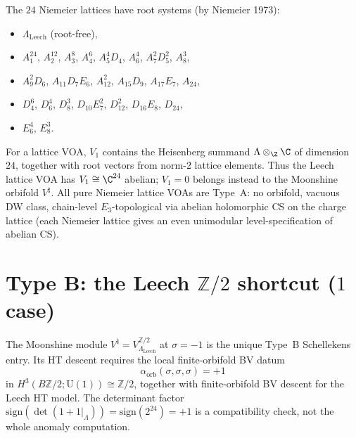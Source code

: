 \begin{remark}
\label{rem:schellekens-24-niemeier-enumeration}
The $24$ Niemeier lattices have root systems (by Niemeier 1973):
\begin{itemize}
\item $\Lambda_{\mathrm{Leech}}$ (root-free),
\item $A_1^{24}$, $A_2^{12}$, $A_3^8$, $A_4^6$,
$A_5^4D_4$, $A_6^4$, $A_7^2D_5^2$, $A_8^3$,
\item $A_9^2D_6$, $A_{11}D_7E_6$, $A_{12}^2$,
$A_{15}D_9$, $A_{17}E_7$, $A_{24}$,
\item $D_4^6$, $D_6^4$, $D_8^3$, $D_{10}E_7^2$,
$D_{12}^2$, $D_{16}E_8$, $D_{24}$,
\item $E_6^4$, $E_8^3$.
\end{itemize}
For a lattice VOA, $V_1$ contains the Heisenberg summand
$\Lambda \otimes_\Z \C$ of dimension~$24$, together with root vectors
from norm-$2$ lattice elements. Thus the Leech lattice VOA has
$V_1 \cong \C^{24}$ abelian; $V_1=0$ belongs instead to the Moonshine
orbifold $V^\natural$. All pure Niemeier lattice VOAs are Type~A: no
orbifold, vacuous DW class,
chain-level $E_3$-topological via abelian holomorphic CS on the charge
lattice (each Niemeier lattice gives an even unimodular
level-specification of abelian CS).
\end{remark}

\section{Type B: the Leech $\mathbb{Z}/2$ shortcut ($1$ case)}
\label{sec:schellekens-typeB-leech-z2}

\begin{proposition}
\label{prop:schellekens-typeB-alpha-zero}
The Moonshine module $V^\natural = V_{\Lambda_{\mathrm{Leech}}}^{\mathbb{Z}/2}$
at $\sigma = -1$ is the unique Type~B Schellekens entry. Its HT
descent requires the local finite-orbifold BV datum
\[
 \alpha_{\mathrm{orb}}(\sigma,\sigma,\sigma)=+1
\]
in $H^3(B\mathbb{Z}/2;\mathrm{U}(1))\cong\mathbb{Z}/2$, together with
finite-orbifold BV descent for the Leech HT model. The determinant
factor
$\mathrm{sign}(\det(1 + 1|_\Lambda)) = \mathrm{sign}(2^{24}) = +1$
is a compatibility check, not the whole anomaly computation.
\end{proposition}

